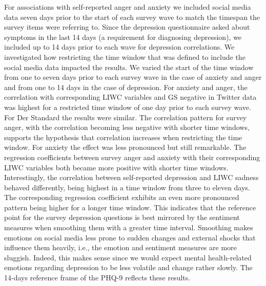\documentclass[
  english,
  jou,floatsintext]{apa7}
\begin{document}
For associations with self-reported anger and anxiety we included social media data seven days prior to the start of each survey wave to match the timespan the survey items were referring to. Since the depression questionnaire asked about symptoms in the last 14 days (a requirement for diagnosing depression), we included up to 14 days prior to each wave for depression correlations. We investigated how restricting the time window that was defined to include the social media data impacted the results. We varied the start of the time window from one to seven days prior to each survey wave in the case of anxiety and anger and from one to 14 days in the case of depression.
For anxiety and anger, the correlation with corresponding LIWC variables and GS negative in Twitter data was highest for a restricted time window of one day prior to each survey wave. For Der Standard the results were similar. The correlation pattern for survey anger, with the correlation becoming less negative with shorter time windows, supports the hypothesis that correlation increases when restricting the time window. For anxiety the effect was less pronounced but still remarkable. The regression coefficients between survey anger and anxiety with their corresponding LIWC variables both became more positive with shorter time windows. Interestingly, the correlation between self-reported depression and LIWC sadness behaved differently, being highest in a time window from three to eleven days. The corresponding regression coefficient exhibits an even more pronounced pattern being higher for a longer time window. This indicates that the reference point for the survey depression questions is best mirrored by the sentiment measures when smoothing them with a greater time interval. Smoothing makes emotions on social media less prone to sudden changes and external shocks that influence them heavily, i.e., the emotion and sentiment measures are more sluggish. Indeed, this makes sense since we would expect mental health-related emotions regarding depression to be less volatile and change rather slowly. The 14-days reference frame of the PHQ-9 reflects these results.
\end{document}
